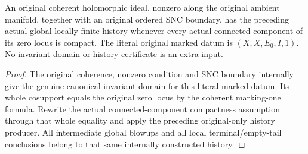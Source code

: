 \begin{corollary}
\label{hir:original-coherent-ideal-component-compact-scheduler}
\leanok
An original coherent holomorphic ideal, nonzero along the original
ambient manifold, together with an original ordered SNC boundary,
has the preceding actual global locally finite history whenever every
actual connected component of its zero locus is compact. The literal
original marked datum is $(X,X,E_0,I,1)$. No invariant-domain or history
certificate is an extra input.
\end{corollary}
\begin{proof}
The original coherence, nonzero condition and SNC boundary internally
give the genuine canonical invariant domain for this literal marked
datum. Its whole cosupport equals the original zero locus by the
coherent marking-one formula. Rewrite the actual connected-component
compactness assumption through that whole equality and apply the
preceding original-only history producer. All intermediate global
blowups and all local terminal/empty-tail conclusions belong to that
same internally constructed history.
\end{proof}
